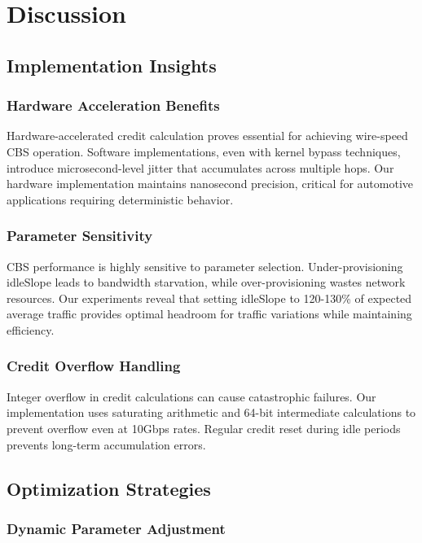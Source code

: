 \documentclass[10pt, journal, compsoc]{IEEEtran}
\begin{document}
\section{Discussion}
\label{sec:discussion}

\subsection{Implementation Insights}

\subsubsection{Hardware Acceleration Benefits}

Hardware-accelerated credit calculation proves essential for achieving wire-speed CBS operation. Software implementations, even with kernel bypass techniques, introduce microsecond-level jitter that accumulates across multiple hops. Our hardware implementation maintains nanosecond precision, critical for automotive applications requiring deterministic behavior.

\subsubsection{Parameter Sensitivity}

CBS performance is highly sensitive to parameter selection. Under-provisioning idleSlope leads to bandwidth starvation, while over-provisioning wastes network resources. Our experiments reveal that setting idleSlope to 120-130\% of expected average traffic provides optimal headroom for traffic variations while maintaining efficiency.

\subsubsection{Credit Overflow Handling}

Integer overflow in credit calculations can cause catastrophic failures. Our implementation uses saturating arithmetic and 64-bit intermediate calculations to prevent overflow even at 10Gbps rates. Regular credit reset during idle periods prevents long-term accumulation errors.

\subsection{Optimization Strategies}

\subsubsection{Dynamic Parameter Adjustment}
\end{document}
